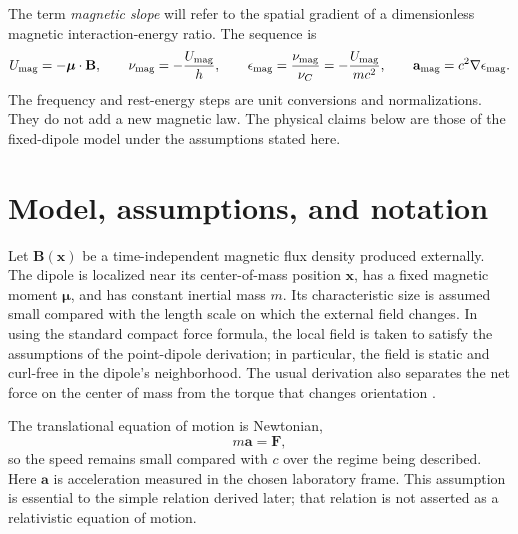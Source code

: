 \documentclass[12pt]{article}
\begin{document}
The term \emph{magnetic slope} will refer to the spatial gradient of a dimensionless magnetic interaction-energy ratio. The sequence is
\begin{equation}
  U_{\rm mag}=-\boldsymbol{\mu}\cdot\mathbf B,
  \qquad
  \nu_{\rm mag}=-\frac{U_{\rm mag}}{h},
  \qquad
  \epsilon_{\rm mag}=\frac{\nu_{\rm mag}}{\nu_C}
                   =-\frac{U_{\rm mag}}{mc^2},
  \qquad
  \mathbf a_{\rm mag}=c^2\nabla\epsilon_{\rm mag}.
  \label{eq:argument-chain}
\end{equation}
The frequency and rest-energy steps are unit conversions and normalizations. They do not add a new magnetic law. The physical claims below are those of the fixed-dipole model under the assumptions stated here.

\section{Model, assumptions, and notation}
\label{sec:model}

Let $\mathbf B(\mathbf x)$ be a time-independent magnetic flux density produced externally. The dipole is localized near its center-of-mass position $\mathbf x$, has a fixed magnetic moment $\boldsymbol{\mu}$, and has constant inertial mass $m$. Its characteristic size is assumed small compared with the length scale on which the external field changes. In using the standard compact force formula, the local field is taken to satisfy the assumptions of the point-dipole derivation; in particular, the field is static and curl-free in the dipole's neighborhood. The usual derivation also separates the net force on the center of mass from the torque that changes orientation \cite{TongDipole}.

The translational equation of motion is Newtonian,
\begin{equation}
  m\mathbf a=\mathbf F,
  \label{eq:newtonian-motion}
\end{equation}
so the speed remains small compared with $c$ over the regime being described. Here $\mathbf a$ is acceleration measured in the chosen laboratory frame. This assumption is essential to the simple relation derived later; that relation is not asserted as a relativistic equation of motion.
\end{document}
